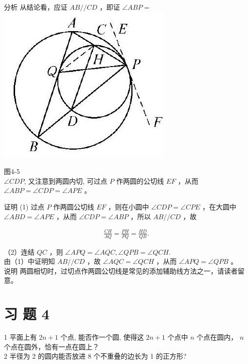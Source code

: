 \documentclass[10pt]{article}
\begin{document}
分析 从结论看，应证 $A B / / C D$ ，即证 $\angle A B P=$\\
\includegraphics[max width=\textwidth, center]{2024_10_30_66b8e5e701da2093c133g-032}

图4-5\\
$\angle C D P$, 又注意到两圆内切, 可过点 $P$ 作两圆的公切线 $E F$ ，从而 $\angle A B P=\angle C D P=\angle A P E$ 。

证明 (1) 过点 $P$ 作两圆公切线 $E F$ ，则在小圆中 $\angle C D P=\angle C P E$ ，在大圆中 $\angle A B D=\angle A P E$ ，从而 $\angle C D P=\angle A B P$ ，所以 $A B / / C D$ ，故

\begin{align*}
\frac{C H}{A Q}=\frac{P H}{P Q}=\frac{H D}{Q B} .
\end{align*}

（2）连结 $Q C$ ，则 $\angle A P Q=\angle A Q C, \angle Q P B=\angle Q C H$.\\
由（1）中证明知 $A B / / C D$ ，故 $\angle A Q C=\angle Q C H$ ，从而 $\angle A P Q=\angle Q P B$ 。\\
说明 两圆相切时，过切点作两圆公切线是常见的添加辅助线方法之一，请读者留意。

\section*{习 题 4}
1 平面上有 $2 n+1$ 个点, 能否作一个圆, 使得这 $2 n+1$ 个点中 $n$ 个点在圆内， $n$ 个点在圆外，恰有一点在圆上？\\
2 半径为 2 的圆内能否放进 8 个不重叠的边长为 1 的正方形?
\end{document}
